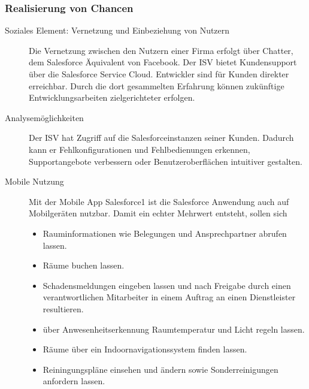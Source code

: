 \subsubsection{Realisierung von Chancen}
\begin{description}
	\item[Soziales Element: Vernetzung und Einbeziehung von Nutzern] Die 
Vernetzung zwischen den Nutzern einer Firma erfolgt über Chatter, dem 
Salesforce Äquivalent von Facebook. Der ISV bietet Kundensupport über die 
Salesforce Service Cloud. Entwickler sind für Kunden direkter erreichbar. Durch 
die dort gesammelten Erfahrung können zukünftige Entwicklungsarbeiten 
zielgerichteter erfolgen.
	\item[Analysemöglichkeiten] Der ISV hat Zugriff auf die 
Salesforceinstanzen seiner Kunden. Dadurch kann er Fehlkonfigurationen 
und Fehlbedienungen erkennen, Supportangebote verbessern oder 
Benutzeroberflächen intuitiver gestalten.
	\item[Mobile Nutzung] Mit der Mobile App Salesforce1 ist die Salesforce 
Anwendung auch auf Mobilgeräten nutzbar. Damit ein echter Mehrwert entsteht, 
sollen sich
\begin{itemize}
	\item Rauminformationen wie Belegungen und Ansprechpartner abrufen 
lassen.
	\item Räume buchen lassen.
	\item Schadensmeldungen eingeben lassen und nach Freigabe durch einen 
verantwortlichen Mitarbeiter in einem Auftrag an einen Dienstleister 
resultieren.
	\item über Anwesenheitserkennung Raumtemperatur und Licht regeln lassen.
	\item Räume über ein Indoornavigationssystem finden lassen.
	\item Reiningungspläne einsehen und ändern sowie Sonderreinigungen 
anfordern lassen.
\end{itemize}


\end{description}
